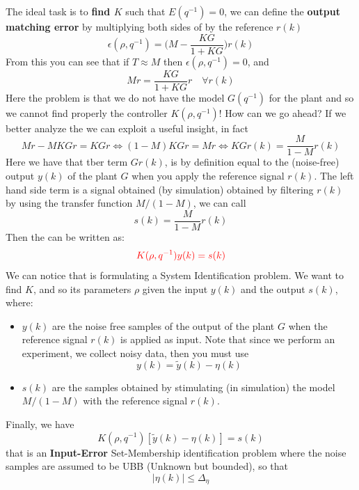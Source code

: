 \noindent
The ideal task is to \textbf{find $K$} such that $E(q^{-1})=0$, we can define the \textbf{output matching error} by multiplying both sides of  by the reference $r(k)$
\begin{equation}
    \epsilon(\rho,q^{-1})=\bigg(
        M-\frac{KG}{1+KG}
    \bigg)r(k)
\end{equation}
From this you can see that if $T \approx M$ then $\epsilon(\rho, q^{-1})=0$, and 
\begin{equation}\label{eq:final}
    Mr = \frac{KG}{1+KG}r      \quad    \forall r(k) 
\end{equation}
Here the problem is that we do not have the model $G(q^{-1})$ for the plant and so we cannot find properly the controller $K(\rho, q^{-1})$! How can we go ahead? If we better analyze the  we can exploit a useful insight, in fact
\begin{equation}\label{eq:dddc1}
    Mr-MKGr = KGr \iff (1-M)KGr = Mr \iff KGr(k) = \frac{M}{1-M} r(k)
\end{equation}
Here we have that tber term $Gr(k)$, is by definition equal to the (noise-free) output $y(k)$ of the plant $G$ when you apply the reference signal $r(k)$. The left hand side term is a signal obtained (by simulation) obtained by filtering $r(k)$ by using the transfer function $M/(1-M)$, we can call
\begin{equation}
    s(k)=\frac{M}{1-M}r(k) 
\end{equation}
Then the  can be written as:
\begin{equation}\label{eq:dddc2}
    \Large
    \color{red}
    K(\rho,q^{-1}) y(k) = s(k)
\end{equation}
We can notice that  is formulating a System Identification problem. We want to find $K$, and so its parameters $\rho$ given the input $y(k)$ and the output $s(k)$, where: 
\begin{itemize}
    \itemsep-0.3em
    \item $y(k)$ are the noise free samples of the output of the plant $G$ when the reference signal $r(k)$ is applied as input. Note that since we perform an experiment, we collect noisy data, then you must use
    \begin{equation}
        y(k)=\tilde{y}(k)-\eta(k)
    \end{equation}
    \item $s(k)$ are the samples obtained by stimulating (in simulation) the model $M/(1-M)$ with the reference signal $r(k)$.
\end{itemize}
Finally, we have
\begin{equation}\label{eq:dddc3}
    K(\rho,q^{-1}) [\tilde{y}(k)-\eta(k)] = s(k)
 \end{equation}
that is an \textbf{Input-Error} Set-Membership identification problem where the noise samples are assumed to be UBB (Unknown but bounded), so that
\begin{equation}
    \vert \eta(k) \vert \le \Delta_\eta
\end{equation}

